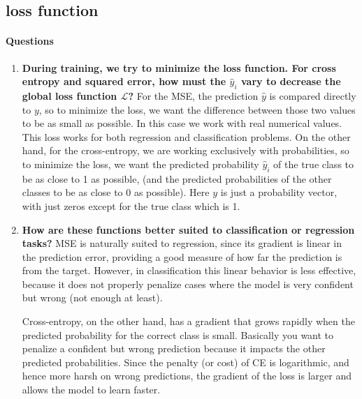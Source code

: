 \documentclass[12pt,a4paper]{article}
\begin{document}
\subsection{loss function}

\paragraph{Questions}

\begin{enumerate}[resume]
    \item \textbf{During training, we try to minimize the loss function. For cross entropy and squared error, how must
the $\hat{y}_i$ vary to decrease the global loss function $\mathcal{L}$?} \newline
    For the MSE, the prediction $\hat{y}$ is compared directly to $y$, so to minimize the loss, 
    we want the difference between those two values to be as small as possible. In this case we work 
    with real numerical values. This loss works for both regression and classification problems. \newline
    On the other hand, for the cross-entropy, we are working exclusively with probabilities, so to minimize the loss,
    we want the predicted probability $\hat{y}_i$ of the true class to be as close to 1 as possible,
    (and the predicted probabilities of the other classes to be as close to 0 as possible). Here $y$ is just a 
    probability vector, with just zeros except for the true class which is 1.

    \item \textbf{How are these functions better suited to classification or regression tasks?} \newline
    MSE is naturally suited to regression, since its gradient is linear in the prediction error, 
    providing a good measure of how far the prediction is from the target. 
    However, in classification this linear behavior is less effective, because it does not 
    properly penalize cases where the model is very confident but wrong (not enough at least).  

    Cross-entropy, on the other hand, has a gradient that grows rapidly 
    when the predicted probability for the correct class is small. 
    Basically you want to penalize a confident but wrong prediction because it impacts the other predicted probabilities.
    Since the penalty (or cost) of CE is logarithmic, and hence more harsh on wrong predictions,
    the gradient of the loss is larger and allows the model to learn faster.


\end{enumerate}
\end{document}
